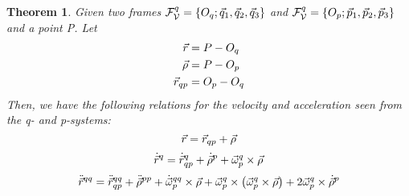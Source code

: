 \documentclass{article}
\newtheorem{theorem}{Theorem}
\begin{document}
\begin{theorem}
    Given two frames $\mathcal{F}_{\mathcal{V}}^q = \left\{ O_q; \vec{q}_1, \vec{q}_2, \vec{q}_3\right\}$ and $\mathcal{F}_{\mathcal{V}}^q = \left\{ O_p; \vec{p}_1, \vec{p}_2, \vec{p}_3\right\}$ and a point P. Let 
    \begin{align*}
        \vec{r} &= P-O_q \\
        \vec{\rho} &= P-O_p\\
        \vec{r}_{qp} &= O_p-O_q \\
    \end{align*}
    Then, we have the following relations for the velocity and acceleration seen from the q- and p-systems:
        $$\vec{r} = \vec{r}_{qp} + \vec{\rho} $$
        $$\dot{\vec{r}}^q = \dot{\vec{r}}_{qp}^q + \dot{\vec{\rho}}^p + \vec{\omega}_p^q \times \vec{\rho} $$
        $$\ddot{\vec{r}}^{qq} = \ddot{\vec{r}}_{qp}^{qq} + \ddot{\vec{\rho}}^{pp} + \dot{\vec{\omega}}_p^{qq}\times\vec{\rho} + \vec{\omega}_p^q\times \left(\vec{\omega}_p^q\times\vec{\rho}\right)+2\vec{\omega}_p^q\times \dot{\vec{\rho}}^p$$
\end{theorem}
\end{document}
